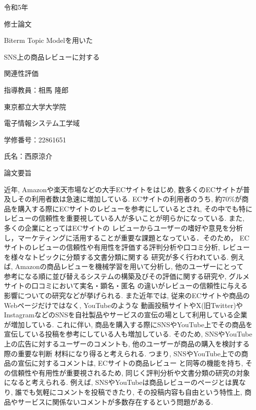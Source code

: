 \documentclass{ltjarticle}
\begin{document}
\begin{titlepage}
    \begin{center}
        {\Large 令和5年}
        \vspace{10truept}

        {\Large 修士論文}
        \vspace*{180truept}

        {\Huge Biterm Topic Modelを用いた}\par
        {\Huge SNS上の商品レビューに対する}\par
        {\Huge 関連性評価}
        \vspace{160truept}

        {\Large 指導教員：相馬 隆郎}
        \vspace{30truept}

        {\Large 東京都立大学大学院}
        \vspace{10truept}

        {\Large 電子情報システム工学域}
        \vspace{30truept}

        {\Large 学修番号：22861651}
        \vspace{10truept}
        
        {\Large 氏名：西原涼介}
    \end{center}
\end{titlepage}
\noindent
{\LARGE 論文要旨}
\vspace{20truept}

近年, Amazonや楽天市場などの大手ECサイトをはじめ, 数多くのECサイトが普及しその利用者数は急速に増加している. 
ECサイトの利用者のうち, 約70\%が商品を購入する際にECサイトのレビューを参考にしているとされ, 
その中でも特にレビューの信頼性を重要視している人が多いことが明らかになっている. また, 多くの企業にとってはECサイトの
レビューからユーザーの嗜好や意見を分析し，マーケティングに活用することが重要な課題となっている．そのため，
ECサイトのレビューの信頼性や有用性を評価する評判分析や口コミ分析, レビューを様々なトピックに分類する文書分類に関する
研究が多く行われている. 例えば, Amazonの商品レビューを機械学習を用いて分析し, 他のユーザーにとって
参考になる順に並び替えるシステムの構築及びその評価に関する研究や, グルメサイトの口コミにおいて実名・顕名・匿名
の違いがレビューの信頼性に与える影響についての研究などが挙げられる. 
また近年では, 従来のECサイトや商品のWebページだけではなく, YouTubeのような
動画投稿サイトやX(旧Twitter)やInstagramなどのSNSを自社製品やサービスの宣伝の場として利用している企業が増加している. 
これに伴い, 商品を購入する際にSNSやYouTube上でその商品を宣伝している投稿を参考にしている人も増加している. 
そのため, SNSやYouTube上の広告に対するユーザーのコメントも, 他のユーザーが商品の購入を検討する際の重要な判断
材料になり得ると考えられる. つまり, SNSやYouTube上での商品の宣伝に対するコメントは, ECサイトの商品レビュー
と同等の機能を持ち, その信頼性や有用性が重要視されるため, 同じく評判分析や文書分類の研究の対象になると考えられる. 
例えば, SNSやYouTubeは商品レビューのページとは異なり, 誰でも気軽にコメントを投稿できたり, その投稿内容も自由という特性上, 
商品やサービスに関係ないコメントが多数存在するという問題がある.
\end{document}
